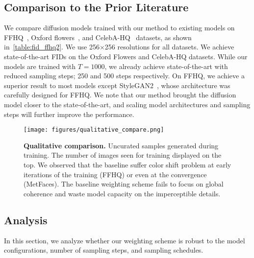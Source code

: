 \subsection{Comparison to the Prior Literature}
\label{sec:experiment_literature}
We compare diffusion models trained with our method to existing models on FFHQ~\cite{stylegan}, Oxford flowers~\cite{nilsback2008automated}, and CelebA-HQ~\cite{karras2017progressive} datasets, as shown in~\cref{table:fid_ffhq2}. We use 256$\times$256 resolutions for all datasets. We achieve state-of-the-art FIDs on the Oxford Flowers and CelebA-HQ datasets. While our models are trained with $T=1000$, we already achieve state-of-the-art with reduced sampling steps; 250 and 500 steps respectively. On FFHQ, we achieve a superior result to most models except StyleGAN2~\cite{karras2020analyzing}, whose architecture was carefully designed for FFHQ. We note that our method brought the diffusion model closer to the state-of-the-art, and scaling model architectures and sampling steps will further improve the performance.


\begin{figure*}[t!]
  \centering
  \texttt{[image: figures/qualitative\_compare.png]}
  \caption{\textbf{Qualitative comparison.} Uncurated samples generated during training. The number of images seen for training displayed on the top. We observed that the baseline suffer color shift problem at early iterations of the training (FFHQ) or even at the convergence (MetFaces). The baseline weighting scheme fails to focus on global coherence and waste model capacity on the imperceptible details.}
  \label{fig:quality_compare}
\end{figure*}




\subsection{Analysis}
\label{sec:experiment_analysis}
In this section, we analyze whether our weighting scheme is robust to the model configurations, number of sampling steps, and sampling schedules.

